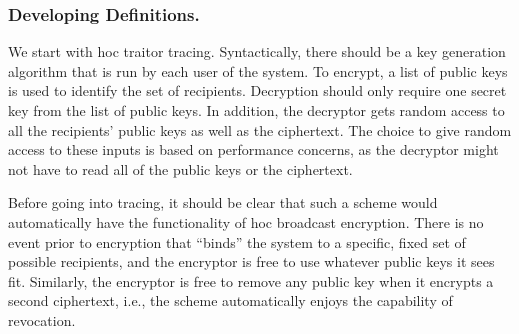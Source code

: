 \subsubsection{Developing Definitions.}
We start with \ad hoc traitor tracing.
Syntactically, there should be a key generation algorithm that is run by each user of the system.
To encrypt, a list of public keys is used to identify the set of recipients.
Decryption should only require one secret key from the list of public keys.
In addition, the decryptor gets random access to all the recipients' public keys as well as the ciphertext.
The choice to give random access to these inputs is based on performance concerns, as the decryptor might not have to read all of the public keys or the ciphertext.

Before going into tracing, it should be clear that such a scheme would automatically have the functionality of \ad hoc broadcast encryption.
There is no event prior to encryption that ``binds'' the system to a specific, fixed set of possible recipients, and the encryptor is free to use whatever public keys it sees fit.
Similarly, the encryptor is free to remove any public key when it encrypts a second ciphertext, i.e., the scheme automatically enjoys the capability of revocation.
